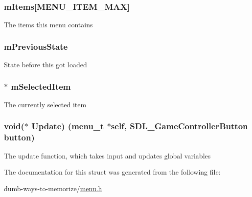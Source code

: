 \subsubsection[{\texorpdfstring{m\+Items}{mItems}}]{ m\+Items\mbox{[}{\bf M\+E\+N\+U\+\_\+\+I\+T\+E\+M\+\_\+\+M\+AX}\mbox{]}}\hypertarget{structmenu__s_a0cc653a44ba5b3f6fc46b8c43131c18b}{}\label{structmenu__s_a0cc653a44ba5b3f6fc46b8c43131c18b}
The items this menu contains 
\subsubsection[{\texorpdfstring{m\+Previous\+State}{mPreviousState}}]{ m\+Previous\+State}\hypertarget{structmenu__s_a5caad79c0b16c966cdace805942e2592}{}\label{structmenu__s_a5caad79c0b16c966cdace805942e2592}
State before this got loaded 
\subsubsection[{\texorpdfstring{m\+Selected\+Item}{mSelectedItem}}]{$\ast$ m\+Selected\+Item}\hypertarget{structmenu__s_a02f9bbc347b039857ac927bfa84b66cf}{}\label{structmenu__s_a02f9bbc347b039857ac927bfa84b66cf}
The currently selected item 
\subsubsection[{\texorpdfstring{Update}{Update}}]{\setlength{\rightskip}{0pt plus 5cm}void($\ast$ Update) ({\bf menu\+\_\+t} $\ast$self, S\+D\+L\+\_\+\+Game\+Controller\+Button button)}\hypertarget{structmenu__s_afdc00f47a596fec9f5362aeab002e868}{}\label{structmenu__s_afdc00f47a596fec9f5362aeab002e868}
The update function, which takes input and updates global variables 

The documentation for this struct was generated from the following file\+:\begin{DoxyCompactItemize}
\item 
dumb-\/ways-\/to-\/memorize/\hyperlink{menu_8h}{menu.\+h}\end{DoxyCompactItemize}
